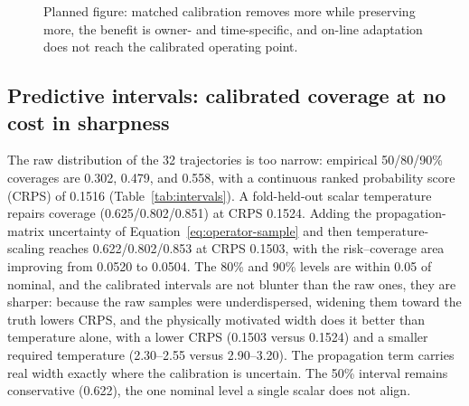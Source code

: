 \begin{figure}[t]
  \centering
  \caption{Planned figure: matched calibration removes more while preserving more, the benefit is owner- and time-specific, and on-line adaptation does not reach the calibrated operating point.}
  \label{fig:natural}
\end{figure}

\subsection{Predictive intervals: calibrated coverage at no cost in sharpness}
\label{sec:res-uq}

The raw distribution of the 32 trajectories is too narrow: empirical 50/80/90\% coverages are 0.302, 0.479, and 0.558, with a continuous ranked probability score (CRPS) of 0.1516 (Table~\ref{tab:intervals}). A fold-held-out scalar temperature repairs coverage (0.625/0.802/0.851) at CRPS 0.1524. Adding the propagation-matrix uncertainty of Equation~\ref{eq:operator-sample} and then temperature-scaling reaches 0.622/0.802/0.853 at CRPS 0.1503, with the risk--coverage area improving from 0.0520 to 0.0504. The 80\% and 90\% levels are within 0.05 of nominal, and the calibrated intervals are not blunter than the raw ones, they are sharper: because the raw samples were underdispersed, widening them toward the truth lowers CRPS, and the physically motivated width does it better than temperature alone, with a lower CRPS (0.1503 versus 0.1524) and a smaller required temperature (2.30--2.55 versus 2.90--3.20). The propagation term carries real width exactly where the calibration is uncertain. The 50\% interval remains conservative (0.622), the one nominal level a single scalar does not align.

